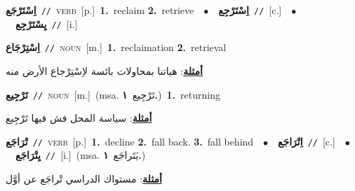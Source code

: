 \documentclass[10pt,a4paper,twoside]{article} %
\begin{document}
\begin{multicols}{2}
{\setlength\topsep{0pt}\textbf{\foreignlanguage{arabic}{اِسْتَرْجَع}}\ {\color{gray}\texttt{//}\color{black}}\ \textsc{verb}\ [p.]\ \textbf{1.}~reclaim  \textbf{2.}~retrieve\ \ $\bullet$\ \ \setlength\topsep{0pt}\textbf{\foreignlanguage{arabic}{اِسْتَرْجِع}}\ {\color{gray}\texttt{//}\color{black}}\ [c.]\ \ $\bullet$\ \ \setlength\topsep{0pt}\textbf{\foreignlanguage{arabic}{يِسْتَرْجِع}}\ {\color{gray}\texttt{//}\color{black}}\ [i.]\ } \vspace{2mm}

{\setlength\topsep{0pt}\textbf{\foreignlanguage{arabic}{اِسْتِرْجَاع}}\ {\color{gray}\texttt{//}\color{black}}\ \textsc{noun}\ [m.]\ \textbf{1.}~reclaimation  \textbf{2.}~retrieval\  \begin{flushright}\color{gray}\foreignlanguage{arabic}{\textbf{\underline{\foreignlanguage{arabic}{أمثلة}}}: هياتنا بمحاولات بائسة لاِسْتِرْجاع الأرض منه}\end{flushright}\color{black}} \vspace{2mm}

{\setlength\topsep{0pt}\textbf{\foreignlanguage{arabic}{تَرْجِيع}}\ {\color{gray}\texttt{//}\color{black}}\ \textsc{noun}\ [m.]\ \color{gray}(msa. \foreignlanguage{arabic}{تَرْجِيع}~\foreignlanguage{arabic}{\textbf{١.}})\color{black}\ \textbf{1.}~returning\  \begin{flushright}\color{gray}\foreignlanguage{arabic}{\textbf{\underline{\foreignlanguage{arabic}{أمثلة}}}: سياسة المحل فش فيها تَرْجِيع}\end{flushright}\color{black}} \vspace{2mm}

{\setlength\topsep{0pt}\textbf{\foreignlanguage{arabic}{تْرَاجَع}}\ {\color{gray}\texttt{//}\color{black}}\ \textsc{verb}\ [p.]\ \textbf{1.}~decline  \textbf{2.}~fall back.  \textbf{3.}~fall behind\ \ $\bullet$\ \ \setlength\topsep{0pt}\textbf{\foreignlanguage{arabic}{اِتْرَاجَع}}\ {\color{gray}\texttt{//}\color{black}}\ [c.]\ \ $\bullet$\ \ \setlength\topsep{0pt}\textbf{\foreignlanguage{arabic}{يِتْرَاجَع}}\ {\color{gray}\texttt{//}\color{black}}\ [i.]\ \color{gray}(msa. \foreignlanguage{arabic}{يَتَراجَع}~\foreignlanguage{arabic}{\textbf{١.}})\color{black}\  \begin{flushright}\color{gray}\foreignlanguage{arabic}{\textbf{\underline{\foreignlanguage{arabic}{أمثلة}}}: مستواك الدراسي تْراجَع عن أوَّل}\end{flushright}\color{black}} \vspace{2mm}


\end{multicols}
\end{document}
